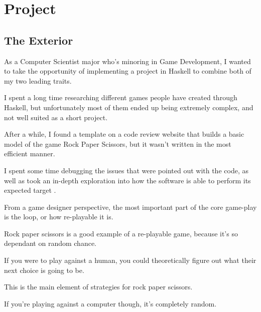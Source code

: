 \documentclass{article}
\begin{document}
\section{Project}

\hspace{\parindent} 
\subsection{The Exterior}
\medskip\medskip
\hspace{\parindent} 

As a Computer Scientist major who's minoring in Game Development, I wanted to take the opportunity of implementing a project in Haskell to combine both of my two leading traits.

\medskip\noindent
I spent a long time researching different games people have created through Haskell, but unfortunately most of them ended up being extremely complex, and not well suited as a short project.

\medskip\noindent
After a while, I found a template on a code review website that builds a basic model of the game Rock Paper Scissors, but it wasn't written in the most efficient manner.

\medskip\noindent
I spent some time debugging the issues that were pointed out with the code, as well as took an in-depth exploration into how the software is able to perform its expected target \cite{SF}.

\medskip\noindent
From a game designer perspective, the most important part of the core game-play is the loop, or how re-playable it is.

\medskip\noindent
Rock paper scissors is a good example of a re-playable game, because it's so dependant on random chance.

\medskip\noindent
If you were to play against a human, you could theoretically figure out what their next choice is going to be.

\medskip\noindent
This is the main element of strategies for rock paper scissors.

\medskip\noindent
If you're playing against a computer though, it's completely random.
\end{document}
